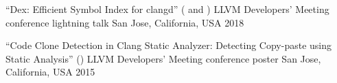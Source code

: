 
\begin{cventries}

  \cventry
    {``Dex: Efficient Symbol Index for clangd''
     ( and
      )}
    {LLVM Developers' Meeting conference lightning talk}
    {San Jose, California, USA}
    {2018}
    {}

  \cventry
    {``Code Clone Detection in Clang Static Analyzer: Detecting Copy-paste using
     Static Analysis''
     ()}
    {LLVM Developers' Meeting conference poster}
    {San Jose, California, USA}
    {2015}
    {}

\end{cventries}
